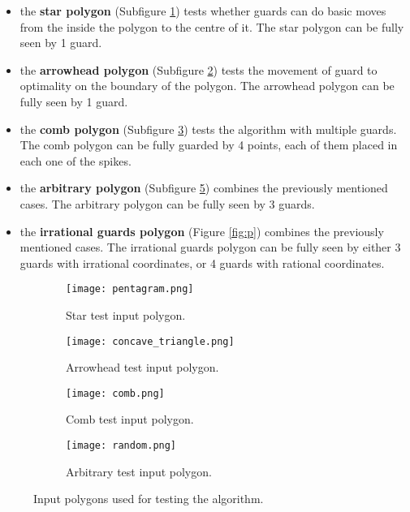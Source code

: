 \begin{itemize}
    \item the \textbf{star polygon} (Subfigure \ref{fig:star}) tests whether guards can do basic moves from the inside the polygon to the centre of it. The star polygon can be fully seen by 1 guard.
    \item the \textbf{arrowhead polygon} (Subfigure \ref{fig:concave}) tests the movement of guard to optimality on the boundary of the polygon. The arrowhead polygon can be fully seen by 1 guard.
    \item the \textbf{comb polygon} (Subfigure \ref{fig:comb}) tests the algorithm with multiple guards. The comb polygon can be fully guarded by 4 points, each of them placed in each one of the spikes.
    \item the \textbf{arbitrary polygon} (Subfigure \ref{fig:random}) combines the previously mentioned cases. The arbitrary polygon can be fully seen by 3 guards.
    \item the \textbf{irrational guards polygon} (Figure \ref{fig:p}) combines the previously mentioned cases. The irrational guards polygon can be fully seen by either 3 guards with irrational coordinates, or 4 guards with rational coordinates.
\end{itemize}

\begin{figure}[h!]
    \centering
    \begin{subfigure}{0.45\textwidth}
        \centering
        \texttt{[image: pentagram.png]}
        \caption{Star test input polygon.}
        \label{fig:star}
    \end{subfigure}
    \begin{subfigure}{0.45\textwidth}
        \centering
        \texttt{[image: concave\_triangle.png]}
        \caption{Arrowhead test input polygon.}
        \label{fig:concave}
    \end{subfigure}
    \begin{subfigure}{0.45\textwidth}
        \centering
        \texttt{[image: comb.png]}
        \caption{Comb test input polygon.}
        \label{fig:comb}
    \end{subfigure}
    \begin{subfigure}{0.45\textwidth}
        \centering
        \texttt{[image: random.png]}
        \caption{Arbitrary test input polygon.}
        \label{fig:random}
    \end{subfigure}
    \caption{Input polygons used for testing the algorithm.}
\end{figure}

